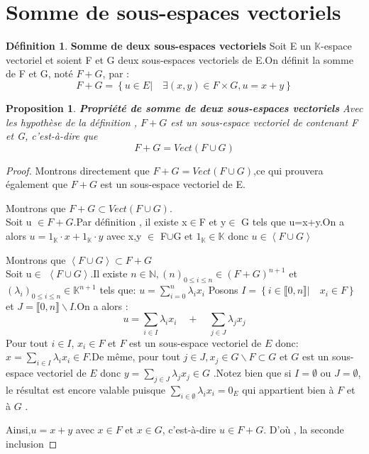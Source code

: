 \documentclass[12pt]{book}
\theoremstyle{definition}\newtheorem{dfn}{Définition}[chapter]
\theoremstyle{plain}\newtheorem{thm}{Théorème}[chapter]
\theoremstyle{plain}\newtheorem{prp}{Proposition}[chapter]
\theoremstyle{plain}\newtheorem{lem}{\bf Lemme}[chapter]
\theoremstyle{plain}\newtheorem{axm}{\bf Axiome}[chapter]
\theoremstyle{plain}\newtheorem{lmm}{\bf Lemme}[chapter]
\theoremstyle{plain}\newtheorem{cor}{\bf Corollaire}[chapter]
\theoremstyle{remark}\newtheorem{rem}{Remarque}[chapter]
\begin{document}
\section{Somme de sous-espaces vectoriels}
\begin{dfn}{\bf Somme de deux sous-espaces vectoriels }
Soit E un $\mathbb{K}$-espace vectoriel et soient F et G deux sous-espaces vectoriels de E.On définit la somme de F et G, noté $F+G$,
par :
$$F+G=\left \{ u\in E |\quad \exists (x,y)\in F\times G,u=x+y \right \} $$
\end{dfn}
\begin{prp}{\bf Propriété de somme de deux sous-espaces vectoriels}
Avec les hypothèse de la définition , $F+G$ est un sous-espace vectoriel  de contenant F et G, c'est-à-dire que
$$F+G=Vect(F\cup G)$$
\end{prp}
\begin{proof}
        Montrons directement que
        $ F+G=Vect(F\cup G)$,ce qui prouvera également que $F+G$
        est un sous-espace vectoriel de
        E.


        Montrons que $ F+G\subset Vect(F\cup G)$.
        \\
        Soit u $\in F+G$.Par définition , il existe x$\in$F et y$\in$ G tels que u=x+y.On a alors $u=1_\mathbb{K}\cdot x+1_\mathbb{K}\cdot y$ avec x,y $\in$ F$\cup$G et $1_\mathbb{K} \in \mathbb{K}$ donc $u\in \left \langle F\cup G \right \rangle$


        Montrons que $\left \langle F\cup G \right \rangle \subset F+G$
\\
Soit u$\in$	$\left \langle F\cup G \right \rangle$.Il existe $n\in \mathbb{N}, (n)_{0\leq i\leq n}\in
(F+G)^{n+1}$ et $(\lambda_i)_{0\leq i\leq n}\in
\mathbb{K}^{n+1}$ tels que: $u=\sum_{i=0}^{n} \lambda_i x_i$
Posons $I=\left \{ i\in \llbracket 0, n \rrbracket |\quad  x_i\in F \right \}$ et $J= \llbracket 0, n \rrbracket \backslash I$.On a alors
:
$$
u=\sum_{i\in I}\lambda_i x_i\quad+\quad \sum_{j\in J}\lambda_j x_j
$$
Pour tout $i \in I$, $x_i \in F$ et $F$ est un sous-espace vectoriel de $E$ donc: $x=\sum_{i\in I}\lambda_i x_i \in F$.De même, pour tout $j \in J, x_j\in G\backslash F \subset G$
et $G$ est un sous-espace vectoriel
de $E$ donc $y=\sum_{j\in J}\lambda_j x_j \in G
$ .Notez bien que si $I=\emptyset$ ou $J=\emptyset$, le résultat est encore valable puisque $\sum_{i\in \emptyset}\lambda_i x_i=0_E$ qui appartient bien à $F$ et à $G$
.

Ainsi,$u=x+y$ avec $x \in F$  et $x \in G$, c'est-à-dire $u \in F+G$. D'où , la seconde inclusion
\end{proof}
\end{document}
